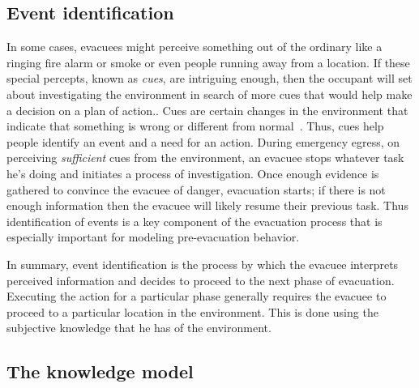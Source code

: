 \subsection{Event identification}
\label{IBEVAC:EventIdentification}

	  In some cases, evacuees might perceive something out of the ordinary like a ringing fire alarm or smoke or even people running away from a location. If these special percepts, known as \emph{cues}, are intriguing enough, then the occupant will set about investigating the environment in search of more cues that would help make a decision on a plan of action.. Cues are certain changes in the environment that indicate that something is wrong or different from normal~\cite{Sime:1983uy}. Thus, cues help people identify an event and a need for an action. During emergency egress, on perceiving \emph{sufficient} cues from the environment, an evacuee stops whatever task he's doing and initiates a process of investigation. Once enough evidence is gathered to convince the evacuee of danger, evacuation starts; if there is not enough information then the evacuee will likely resume their previous task. Thus identification of events is a key component of the evacuation process that is especially important for modeling pre-evacuation behavior.


    In summary, event identification is the process by which the evacuee interprets perceived information and decides to proceed to the next phase of evacuation. Executing the action for a particular phase generally requires the evacuee to proceed to a particular location in the environment. This is done using the subjective knowledge that he has of the environment.

\subsection{The knowledge model}
\label{IBEVAC:Knowledge}


